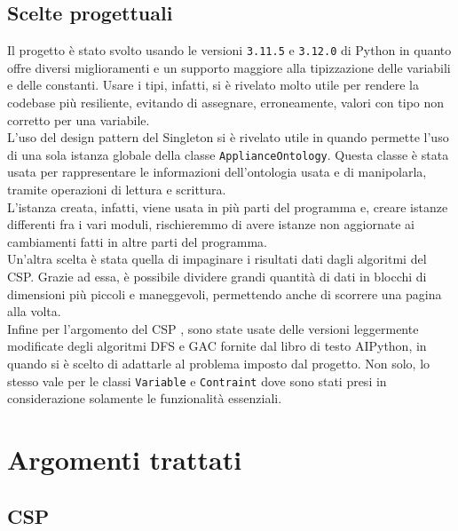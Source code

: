 \documentclass[12pt, letterpaper]{article}
\begin{document}
\subsection{Scelte progettuali}

Il progetto è stato svolto usando le versioni \texttt{3.11.5} e \texttt{3.12.0} di Python in quanto offre diversi
miglioramenti e un supporto maggiore alla tipizzazione delle variabili e delle constanti.
Usare i tipi, infatti, si è rivelato molto utile per rendere la codebase più resiliente, evitando di
assegnare, erroneamente, valori con tipo non corretto per una variabile. \\

\noindent L'uso del design pattern del Singleton si è rivelato utile in quando permette l'uso di
una sola istanza globale della classe \texttt{ApplianceOntology}. Questa classe è stata usata per
rappresentare le informazioni dell'ontologia usata e di manipolarla, tramite operazioni di lettura e
scrittura. \\

\noindent L'istanza creata, infatti, viene usata in più parti del programma e, creare istanze differenti
fra i vari moduli, rischieremmo di avere istanze non aggiornate ai cambiamenti fatti in altre parti del
programma. \\

\noindent Un'altra scelta è stata quella di impaginare \cite{pagination} i risultati dati dagli algoritmi del CSP.
Grazie ad essa, è possibile  dividere grandi quantità di dati in blocchi di dimensioni più piccoli e maneggevoli,
permettendo anche di scorrere una pagina alla volta. \\

\noindent Infine per l'argomento del CSP \cite{ai-python-csp}, sono state usate delle versioni leggermente modificate degli
algoritmi DFS e GAC fornite dal libro di testo AIPython, in quando si è scelto di adattarle al problema
imposto dal progetto. Non solo, lo stesso vale per le classi \texttt{Variable} e \texttt{Contraint} dove sono
stati presi in considerazione solamente le funzionalità essenziali.


\section{Argomenti trattati}

\subsection{CSP}
\end{document}
